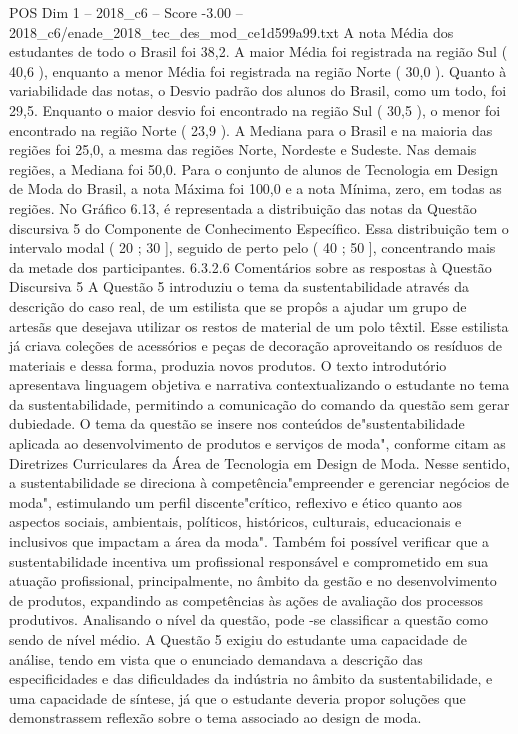 \begin{textsample}{POS Dim 1 – 2018\_c6 – Score -3.00 – 2018\_c6/enade\_2018\_tec\_des\_mod\_ce1d599a99.txt}
A nota Média dos estudantes de todo o Brasil foi 38,2.
A maior Média foi registrada na região Sul ( 40,6 ), enquanto a menor Média foi registrada na região Norte ( 30,0 ).
Quanto à variabilidade das notas, o Desvio padrão dos alunos do Brasil, como um todo, foi 29,5.
Enquanto o maior desvio foi encontrado na região Sul ( 30,5 ), o menor foi encontrado na região Norte ( 23,9 ).
A Mediana para o Brasil e na maioria das regiões foi 25,0, a mesma das regiões Norte, Nordeste e Sudeste.
Nas demais regiões, a Mediana foi 50,0.
Para o conjunto de alunos de Tecnologia em Design de Moda do Brasil, a nota Máxima foi 100,0 e a nota Mínima, zero, em todas as regiões.
No Gráfico 6.13, é representada a distribuição das notas da Questão discursiva 5 do Componente de Conhecimento Específico.
Essa distribuição tem o intervalo modal ( 20 ; 30 ], seguido de perto pelo ( 40 ; 50 ], concentrando mais da metade dos participantes. 6.3.2.6 Comentários sobre as respostas à Questão Discursiva 5 A Questão 5 introduziu o tema da sustentabilidade através da descrição do caso real, de um estilista que se propôs a ajudar um grupo de artesãs que desejava utilizar os restos de material de um polo têxtil.
Esse estilista já criava coleções de acessórios e peças de decoração aproveitando os resíduos de materiais e dessa forma, produzia novos produtos.
O texto introdutório apresentava linguagem objetiva e narrativa contextualizando o estudante no tema da sustentabilidade, permitindo a comunicação do comando da questão sem gerar dubiedade.
O tema da questão se insere nos conteúdos de"sustentabilidade aplicada ao desenvolvimento de produtos e serviços de moda", conforme citam as Diretrizes Curriculares da Área de Tecnologia em Design de Moda.
Nesse sentido, a sustentabilidade se direciona à competência"empreender e gerenciar negócios de moda", estimulando um perfil discente"crítico, reflexivo e ético quanto aos aspectos sociais, ambientais, políticos, históricos, culturais, educacionais e inclusivos que impactam a área da moda".
Também foi possível verificar que a sustentabilidade incentiva um profissional responsável e comprometido em sua atuação profissional, principalmente, no âmbito da gestão e no desenvolvimento de produtos, expandindo as competências às ações de avaliação dos processos produtivos.
Analisando o nível da questão, pode -se classificar a questão como sendo de nível médio.
A Questão 5 exigiu do estudante uma capacidade de análise, tendo em vista que o enunciado demandava a descrição das especificidades e das dificuldades da indústria no âmbito da sustentabilidade, e uma capacidade de síntese, já que o estudante deveria propor soluções que demonstrassem reflexão sobre o tema associado ao design de moda.

\end{textsample}
